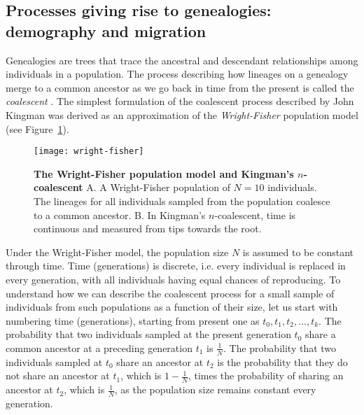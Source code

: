 \subsection{Processes giving rise to genealogies: demography and migration\label{sub:molecular_clock}}

Genealogies are trees that trace the ancestral and descendant relationships among individuals in a population.
The process describing how lineages on a genealogy merge to a common ancestor as we go back in time from the present is called the \textit{coalescent} \citep{Kingman1982}.
The simplest formulation of the coalescent process described by John Kingman was derived as an approximation of the \textit{Wright-Fisher} \citep{Fisher1930,Wright1931} population model (see Figure~\ref{fig:wright-fisher}).

\begin{figure}[H]
\centering
\texttt{[image: wright-fisher]} 
\caption{
{ \footnotesize 
{\bf The Wright-Fisher population model and Kingman's $n$-coalescent} A. A Wright-Fisher population of $N=10$ individuals. The lineages for all individuals sampled from the population coalesce to a common ancestor.
B.  In Kingman's $n$-coalescent, time is continuous and measured from tips towards the root.
}%
}
\label{fig:wright-fisher}
\end{figure}

Under the Wright-Fisher model, the population size $N$ is assumed to be constant through time.
Time (generations) is discrete, i.e. every individual is replaced in every generation, with all individuals having equal chances of reproducing.
To understand how we can describe the coalescent process for a small sample of individuals from such populations as a function of their size, let us start with numbering time (generations), starting from present one as $t_{0},t_{1},t_{2},\ldots,t_{k}$.
The probability that two individuals sampled at the present generation $t_{0}$ share a common ancestor at a preceding generation $t_{1}$ is $\frac{1}{N}$.
The probability that two individuals sampled at $t_{0}$ share an ancestor at $t_{2}$ is the probability that they do not share an ancestor at $t_{1}$, which is $1-\frac{1}{N}$, times the probability of sharing an ancestor at $t_{2}$, which is $\frac{1}{N}$, as the population size remains constant every generation.


